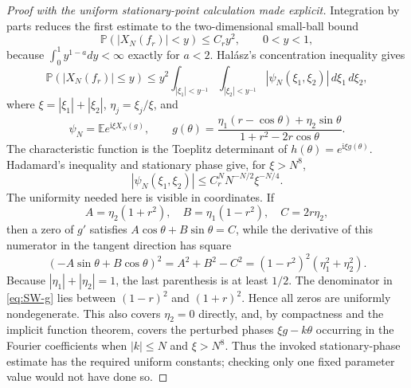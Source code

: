 \begin{proof}[Proof with the uniform stationary-point calculation made explicit]
Integration by parts reduces the first estimate to the two-dimensional small-ball bound
\begin{equation}
 \mathbb P(|X_N(f_r)|<y)\leq C_ry^2,\qquad 0<y<1,
 \label{eq:SW-small-ball-target}
\end{equation}
because $\int_0^1y^{1-a}dy<\infty$ exactly for $a<2$.  Hal\'asz's concentration
inequality \cite[Sec.~5]{halasz1977} gives
\begin{equation}
 \mathbb P(|X_N(f_r)|\leq y)
 \leq y^2\int_{|\xi_1|<y^{-1}}\int_{|\xi_2|<y^{-1}}
 |\psi_N(\xi_1,\xi_2)|\,d\xi_1\,d\xi_2,
 \label{eq:SW-Halasz}
\end{equation}
where $\xi=|\xi_1|+|\xi_2|$, $\eta_j=\xi_j/\xi$, and
\begin{equation}
 \psi_N=\mathbb E e^{\mathrm i\xi X_N(g)},\qquad
 g(\theta)=\frac{\eta_1(r-\cos\theta)+\eta_2\sin\theta}
 {1+r^2-2r\cos\theta}.
 \label{eq:SW-g}
\end{equation}
The characteristic function is the Toeplitz determinant of
$h(\theta)=e^{\mathrm i\xi g(\theta)}$.  Hadamard's inequality and stationary phase give,
for $\xi>N^8$,
\begin{equation}
 |\psi_N(\xi_1,\xi_2)|\leq C_r^N N^{-N/2}\xi^{-N/4}.
 \label{eq:SW-high-frequency}
\end{equation}
The uniformity needed here is visible in coordinates.  If
\begin{equation}
 A=\eta_2(1+r^2),\quad B=\eta_1(1-r^2),\quad C=2r\eta_2,
\end{equation}
then a zero of $g'$ satisfies $A\cos\theta+B\sin\theta=C$, while the derivative of this
numerator in the tangent direction has square
\begin{equation}
 (-A\sin\theta+B\cos\theta)^2=A^2+B^2-C^2
 =(1-r^2)^2(\eta_1^2+\eta_2^2).
 \label{eq:SW-stationary-nondegenerate}
\end{equation}
Because $|\eta_1|+|\eta_2|=1$, the last parenthesis is at least $1/2$.  The denominator in
\eqref{eq:SW-g} lies between $(1-r)^2$ and $(1+r)^2$.  Hence all zeros are uniformly
nondegenerate.  This also covers $\eta_2=0$ directly, and, by compactness and the implicit
function theorem, covers the perturbed phases $\xi g-k\theta$ occurring in the Fourier
coefficients when $|k|\leq N$ and $\xi>N^8$.  Thus the invoked stationary-phase estimate
\cite[Ch.~6]{bleisteinHandelsman1986} has the required uniform constants; checking only one
fixed parameter value would not have done so.


\end{proof}
